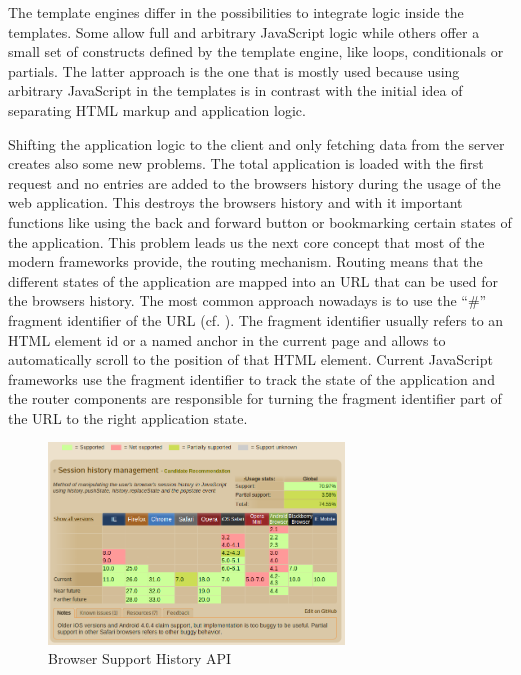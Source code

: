 The template engines differ in the possibilities to integrate logic inside the templates.
Some allow full and arbitrary JavaScript logic while others offer a small set of constructs defined by the template engine, like loops, conditionals or partials.
The latter approach is the one that is mostly used because using arbitrary JavaScript in the templates is in contrast with the initial idea of separating HTML markup and application logic.

Shifting the application logic to the client and only fetching data from the server creates also some new problems.
The total application is loaded with the first request and no entries are added to the browsers history during the usage of the web application.
This destroys the browsers history and with it important functions like using the back and forward button or bookmarking certain states of the application.
This problem leads us the next core concept that most of the modern frameworks provide, the routing mechanism.
Routing means that the different states of the application are mapped into an URL that can be used for the browsers history.
The most common approach nowadays is to use the \enquote{\#} fragment identifier of the URL (cf. \autocite{spi_manifesto}).
The fragment identifier usually refers to an HTML element id or a named anchor in the current page and allows to automatically scroll to the position of that HTML element.
Current JavaScript frameworks use the fragment identifier to track the state of the application and the router components are responsible for turning the fragment identifier part of the URL to the right application state.

\begin{figure}
	\centering \includegraphics[width=0.7\textwidth]{./img/web-dev/usage_history_api.png}
	\caption{Browser Support History API \autocite{can_i_use}}
	\label{fig:usage_history_api}
\end{figure}

